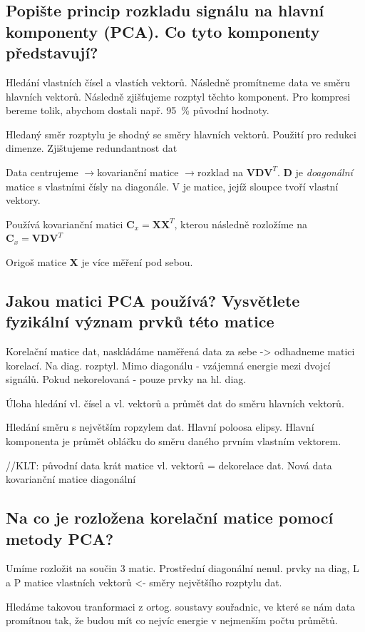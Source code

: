 \documentclass[a4paper,12pt]{article}   %
\newcommand{\rrarr}{$\rightarrow$}
\newcommand{\mt}[1]{$#1$}
\begin{document}
\subsection{Popište princip rozkladu signálu na hlavní komponenty (PCA). Co tyto komponenty představují?}
Hledání vlastních čísel a vlastích vektorů. Následně promítneme data ve směru hlavních vektorů. Následně zjišťujeme rozptyl těchto komponent. Pro kompresi bereme tolik, abychom dostali např. 95~\% původní hodnoty.

Hledaný směr rozptylu je shodný se směry hlavních vektorů. Použití pro redukci dimenze. Zjištujeme redundantnost dat

Data centrujeme \rrarr kovarianční matice \rrarr rozklad na \mt{\pmb{VDV}^T}. \mt{\pmb D} je \textit{doagonální} matice s vlastními čísly na diagonále. V je matice, jejíž sloupce tvoří vlastní vektory. 

Používá kovarianční matici \mt{\pmb C_x = \pmb{XX}^T}, kterou následně rozložíme na \mt{\pmb C_x = \pmb{VDV}^T}

Origoš matice \mt{\pmb X} je více měření pod sebou. 



\subsection{Jakou matici PCA používá? Vysvětlete fyzikální význam prvků této matice}
Korelační matice dat, naskládáme naměřená data za sebe -> odhadneme matici korelací. Na diag. rozptyl. Mimo diagonálu - vzájemná energie mezi dvojcí signálů. Pokud nekorelovaná - pouze prvky na hl. diag. 

Úloha hledání vl. čísel a vl. vektorů a průmět dat do směru hlavních vektorů.

Hledání směru s největším ropzylem dat. Hlavní poloosa elipsy. Hlavní komponenta je průmět obláčku do směru daného prvním vlastním vektorem. 

//KLT: původní data krát matice vl. vektorů = dekorelace dat. Nová data kovarianční matice diagonální


\subsection{Na co je rozložena korelační matice pomocí metody PCA?}
Umíme rozložit na součin 3 matic. Prostřední diagonální nenul. prvky na diag, L a P matice vlastních vektorů <- směry největšího rozptylu dat. 

Hledáme takovou tranformaci z ortog. soustavy souřadnic, ve které se nám data promítnou tak, že budou mít co nejvíc energie v nejmenším počtu průmětů. 
\end{document}
